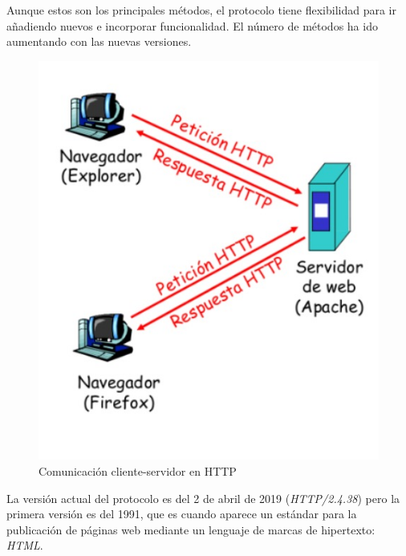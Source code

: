 Aunque estos son los principales métodos, el protocolo tiene flexibilidad para ir añadiendo nuevos e incorporar funcionalidad. El número de métodos ha ido aumentando con las nuevas versiones. 
\begin{figure}[h]
\centering
\includegraphics[scale=0.4]{img/http.jpeg}
\caption{Comunicación cliente-servidor en HTTP} \label{fig:http}
\end{figure}

La versión actual del protocolo es del 2 de abril de 2019 (\textit{HTTP/2.4.38}) pero la primera versión es del 1991, que es cuando aparece un estándar para la publicación de páginas web mediante un lenguaje de marcas de hipertexto: \textit{HTML}.


